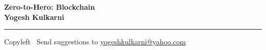 
\graphicspath{{images/}}

\footnotesize


\begin{center}
\Large{\textbf{Zero-to-Hero: Blockchain\\ Yogesh Kulkarni}}  
\end{center}

\begin{multicols}{2}

\end{multicols}

\rule{\linewidth}{0.25pt}
\scriptsize
Copyleft \textcopyleft\  Send suggestions to 
\href{http://www.yogeshkulkarni.com}{yogeshkulkarni@yahoo.com}


